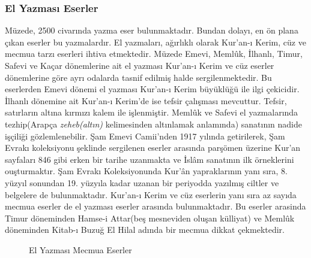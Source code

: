 \subsubsection{El Yazması Eserler}
\indent\indent Müzede, 2500 civarında yazma eser bulunmaktadır. Bundan dolayı, en ön plana çıkan eserler bu yazmalardır. El yazmaları, ağırlıklı olarak Kur'an-ı Kerim, cüz ve mecmua tarzı eserleri ihtiva etmektedir.\newline
\indent Müzede Emevi, Memlûk, İlhanlı, Timur, Safevi ve Kaçar dönemlerine ait el yazması Kur'an-ı Kerim ve cüz eserler dönemlerine göre ayrı odalarda tasnif edilmiş halde sergilenmektedir. Bu eserlerden Emevi dönemi el yazması Kur'an-ı Kerim büyüklüğü ile ilgi çekicidir. İlhanlı dönemine ait Kur'an-ı Kerim'de ise tefsir çalışması mevcuttur. Tefsir, satırların altına kırmızı kalem ile işlenmiştir. Memlûk ve Safevi el yazmalarında tezhip(Arapça \textit{zeheb(altın)} kelimesinden altınlamak anlamında) sanatının nadide işçiliği gözlemlenebilir. Şam Emevi Camii'nden 1917 yılında getirilerek, Şam Evrakı koleksiyonu şeklinde sergilenen eserler arasında parşömen üzerine Kur'an sayfaları 846 gibi erken bir tarihe uzanmakta ve İslâm sanatının ilk örneklerini ouşturmaktır. Şam Evrakı Koleksiyonunda Kur'ân yapraklarının yanı sıra, 8. yüzyıl sonundan 19. yüzyıla kadar uzanan bir periyodda yazılmış ciltler ve belgelere de bulunmaktadır.\newline
\indent Kur'an-ı Kerim ve cüz eserlerin yanı sıra az sayıda mecmua eserler de el yazması eserler arasında bulunmaktadır. Bu eserler arasinda Timur döneminden Hamse-i Attar(beş mesneviden oluşan külliyat) ve Memlûk döneminden Kitab-ı Buzuğ El Hilal adında bir mecmua dikkat çekmektedir.
\begin{figure}[H]
    \centering
    \hfill
    \caption{El Yazması Mecmua Eserler}
\end{figure}
